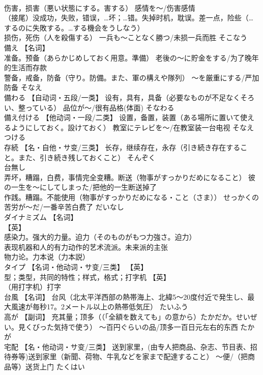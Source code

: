 \documentclass[8pt]{extreport}
\begin{document}
\begin{CJK}{UTF8}{min}
\\	伤害，损害（悪い状態にする。害する） 感情を～/伤害感情 
\\	（接尾）没成功，失败，错误，…坏；…错。失掉时机，耽误。差一点，险些（…するのに失敗する。…する機会をうしなう） 
\\	损伤，死伤（人を殺傷する） 一兵も～ことなく勝つ/未损一兵而胜	そこなう	
\\	備え	【名词】 
\\	准备。预备（あらかじめしておく用意。準備） 老後の～に貯金をする/为了晚年的生活而存款 
\\	警备，戒备，防备（守り。防備。また、軍の構えや隊列） ～を厳重にする/严加防备	そなえ	
\\	備わる	【自动词・五段/一类】 设有，具有，具备（必要なものが不足なくそろい、整っている） 品位が～/很有品格(体面)	そなわる	
\\	備え付ける	【他动词・一段/二类】 设置，备置，装置（ある場所に置いて使えるようにしておく。設けておく） 教室にテレビを～/在教室装一台电视	そなえつける	
\\	存続	【名・自他・サ变/三类】 长存，继续存在，永存（引き続き存在すること。また、引き続き残しておくこと）	そんぞく	
\\	台無し	
\\	弄坏，糟蹋，白费，事情完全变糟。断送（物事がすっかりだめになること） 彼の一生を～にしてしまった/把他的一生断送掉了 
\\	作践。糟蹋。不能使用（物事がすっかりだめになる・こと（さま）） せっかくの苦労が～だ/一番辛苦白费了	だいなし	
\\	ダイナミズム	【名词】 
\\	【英】
\\	感染力。强大的力量。迫力（そのものがもつ力強さ。迫力） 
\\	表现机器和人的有力动作的艺术流派。未来派的主张 
\\	物力论。力本说（力本説）		
\\	タイプ	【名词・他动词・サ变/三类】 【英】
\\	型；类型，共同的特性；样式，格式；打字机 【英】
\\	（用打字机）打字		
\\	台風	【名词】 台风（北太平洋西部の熱帯海上、北緯5～20度付近で発生し、最大風速が毎秒17。2メートル以上の熱帯低気圧）	たいふう	
\\	高が	【副词】 充其量；顶多（（「全額を数えても」の意から）たかだか。せいぜい。見くびった気持で使う） ～百円ぐらいの品/顶多一百日元左右的东西	たかが	
\\	宅配	【名・他动词・サ变/三类】 送到家里，(由专人把商品、杂志、节目表、招待券等)送到家里（新聞、荷物、牛乳などを家まで配達すること） ～便/（把商品等）送货上门	たくはい	

\end{CJK}
\end{document}
